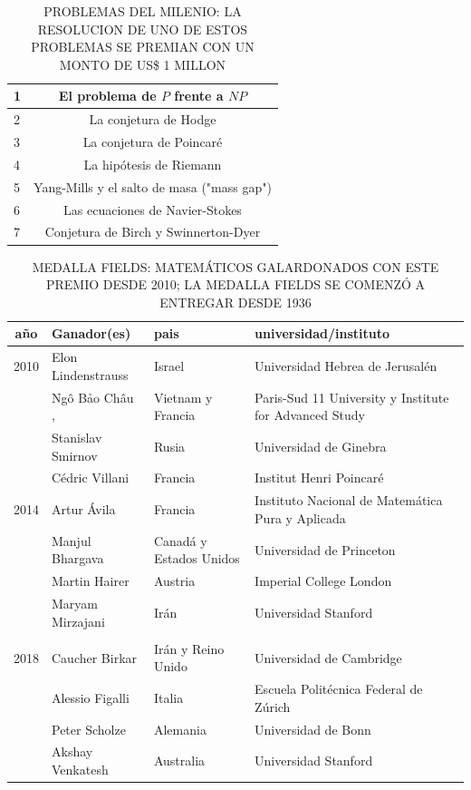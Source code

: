 \begin{table}%
\caption{\MakeUppercase{Problemas del milenio: la resolucion de uno de estos problemas se premian con un monto de us\$ 1 millon}}
\begin{center}
\begin{tabular}{  l c }
    \hline
    1 & El problema de $P$ frente a $NP$  \\ \hline
    2 &  La conjetura de Hodge \\ \hline
    3 &  La conjetura de Poincaré \\ \hline
    4 &  La hipótesis de Riemann \\ \hline
    5 &  Yang-Mills y el salto de masa ("mass gap")\\ \hline
    6 &  Las ecuaciones de Navier-Stokes\\ \hline
    7 &  Conjetura de Birch y Swinnerton-Dyer\\
        \hline
\end{tabular}
\end{center}
\label{table:prob_milenio}
\end{table}


\begin{table}%
\caption{\MakeUppercase{Medalla Fields: matemáticos galardonados con este premio desde 2010; la medalla Fields se comenzó a entregar desde 1936}}
\begin{center}
\begin{tabular}{cp{4cm}p{2.5cm}p{6cm}}
    \hline
    año & Ganador(es) & pais & universidad/instituto\\
    \hline 
        2010 & Elon Lindenstrauss & Israel & Universidad Hebrea de Jerusalén\\
         & Ngô Bảo Châu ,  & Vietnam y Francia &Paris-Sud 11 University y Institute for Advanced Study \\
         & Stanislav Smirnov  & Rusia & Universidad de Ginebra\\
         & Cédric Villani & Francia & Institut Henri Poincaré\\
         \hline
         2014 & Artur Ávila  & Francia &Instituto Nacional de Matemática Pura y Aplicada \\
         & Manjul Bhargava  &  Canadá y Estados Unidos &Universidad de Princeton \\
         & Martin Hairer & Austria & Imperial College London\\
         & Maryam Mirzajani & Irán &Universidad Stanford \\
         \hline\\
         2018	 & Caucher Birkar & Irán y Reino Unido & Universidad de Cambridge \\
         & Alessio Figalli & Italia & Escuela Politécnica Federal de Zúrich \\
         & Peter Scholze & Alemania & Universidad de Bonn\\
         & Akshay Venkatesh  & Australia & Universidad Stanford\\
        \hline
\end{tabular}
\end{center}
\label{table:medalla_fields}
\end{table}

